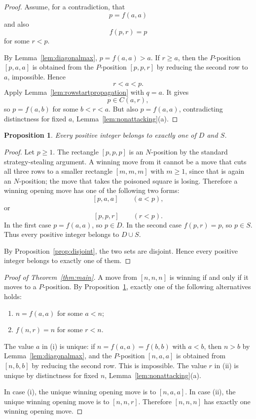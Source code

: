 \documentclass[11pt]{article}
\newtheorem{proposition}[theorem]{Proposition}
\begin{document}
\begin{proof}
Assume, for a contradiction, that
\[
        p=f(a,a)
\]
and also
\[
        f(p,r)=p
\]
for some $r<p$.

By Lemma~\ref{lem:diagonalmax}, $p=f(a,a)>a$. If $r\ge a$, then the
$P$-position $[p,a,a]$ is obtained from the $P$-position $[p,p,r]$ by reducing
the second row to $a$, impossible. Hence
\[
        r<a<p.
\]
Apply Lemma~\ref{lem:rowstartpropagation} with $q=a$. It gives
\[
        p\in C(a,r),
\]
so $p=f(a,b)$ for some $b<r<a$. But also $p=f(a,a)$, contradicting distinctness for fixed $a$, Lemma~\ref{lem:nonattacking}(a).
\end{proof}

\begin{proposition}\label{prop:partition}
Every positive integer belongs to exactly one of $D$ and $S$.
\end{proposition}

\begin{proof}
Let $p\ge 1$. The rectangle $[p,p,p]$ is an $N$-position by the standard
strategy-stealing argument. A winning move from it cannot be a move that cuts
all three rows to a smaller rectangle $[m,m,m]$ with $m\ge 1$, since that is
again an $N$-position; the move that takes the poisoned square is losing.
Therefore a winning opening move has one of the following two forms:
\[
        [p,a,a]\qquad (a<p),
\]
or
\[
        [p,p,r]\qquad (r<p).
\]
In the first case $p=f(a,a)$, so $p\in D$. In the second case $f(p,r)=p$, so
$p\in S$. Thus every positive integer belongs to $D\cup S$.

By Proposition~\ref{prop:disjoint}, the two sets are disjoint. Hence every
positive integer belongs to exactly one of them.
\end{proof}

\begin{proof}[Proof of Theorem~\ref{thm:main}]
A move from $[n,n,n]$ is winning if and only if it moves to a $P$-position. By
Proposition~\ref{prop:partition}, exactly one of the following alternatives
holds:
\begin{enumerate}
\item[(i)] $n=f(a,a)$ for some $a<n$;
\item[(ii)] $f(n,r)=n$ for some $r<n$.
\end{enumerate}
The value $a$ in (i) is unique: if $n=f(a,a)=f(b,b)$ with $a<b$, then $n>b$
by Lemma~\ref{lem:diagonalmax}, and the $P$-position $[n,a,a]$ is obtained
from $[n,b,b]$ by reducing the second row. This is impossible. The value $r$
in (ii) is unique by distinctness for fixed $n$, Lemma~\ref{lem:nonattacking}(a).

In case (i), the unique winning opening move is to $[n,a,a]$. In case (ii),
the unique winning opening move is to $[n,n,r]$. Therefore $[n,n,n]$ has
exactly one winning opening move.
\end{proof}
\end{document}
